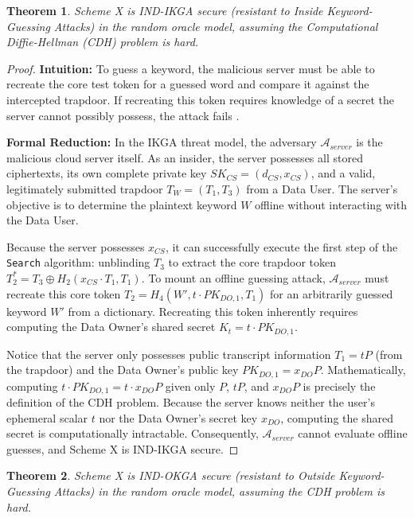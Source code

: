 \documentclass[10pt,journal,compsoc]{IEEEtran}
\newtheorem{theorem}{Theorem}
\begin{document}
\begin{theorem}
Scheme X is IND-IKGA secure (resistant to Inside Keyword-Guessing Attacks) in the random oracle model, assuming the Computational Diffie-Hellman (CDH) problem is hard.
\end{theorem}

\begin{proof}
\textbf{Intuition:} To guess a keyword, the malicious server must be able to recreate the core test token for a guessed word and compare it against the intercepted trapdoor. If recreating this token requires knowledge of a secret the server cannot possibly possess, the attack fails \cite{lu2023certificateless}.

\textbf{Formal Reduction:} In the IKGA threat model, the adversary $\mathcal{A}_{server}$ is the malicious cloud server itself. As an insider, the server possesses all stored ciphertexts, its own complete private key $SK_{CS} = (d_{CS}, x_{CS})$, and a valid, legitimately submitted trapdoor $T_W = (T_1, T_3)$ from a Data User. The server's objective is to determine the plaintext keyword $W$ offline without interacting with the Data User.

Because the server possesses $x_{CS}$, it can successfully execute the first step of the \texttt{Search} algorithm: unblinding $T_3$ to extract the core trapdoor token $T_2^* = T_3 \oplus H_2(x_{CS} \cdot T_1, T_1)$.
To mount an offline guessing attack, $\mathcal{A}_{server}$ must recreate this core token $T_2 = H_4(W', t \cdot PK_{DO,1}, T_1)$ for an arbitrarily guessed keyword $W'$ from a dictionary. Recreating this token inherently requires computing the Data Owner's shared secret $K_{t} = t \cdot PK_{DO,1}$. 

Notice that the server only possesses public transcript information $T_1 = tP$ (from the trapdoor) and the Data Owner's public key $PK_{DO,1} = x_{DO}P$. Mathematically, computing $t \cdot PK_{DO,1} = t \cdot x_{DO}P$ given only $P$, $tP$, and $x_{DO}P$ is precisely the definition of the CDH problem. Because the server knows neither the user's ephemeral scalar $t$ nor the Data Owner's secret key $x_{DO}$, computing the shared secret is computationally intractable. Consequently, $\mathcal{A}_{server}$ cannot evaluate offline guesses, and Scheme X is IND-IKGA secure.
\end{proof}

\begin{theorem}
Scheme X is IND-OKGA secure (resistant to Outside Keyword-Guessing Attacks) in the random oracle model, assuming the CDH problem is hard.
\end{theorem}
\end{document}
